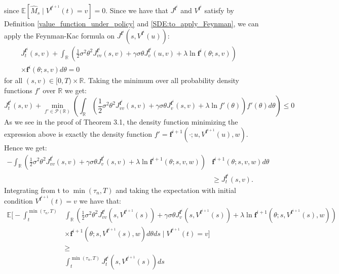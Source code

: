 \documentclass[oneside, a4paper, onecolumn, 11pt]{article}
\begin{document}
since $\mathbb{E}[\hat{M}_s\mid V^{\boldsymbol{f}^{i+1}}(t) = v]= 0$.
Since we have that $J^{\boldsymbol{f}^i}$ and $V^{\boldsymbol{f}^{i}}$ satisfy by Definition \eqref{value_function_under_policy}  and \eqref{SDE:to_apply_Feynman}, we can apply the Feynman-Kac formula on $J^{\boldsymbol{f}^i}(s,V^{\boldsymbol{f}^{i}}(u))$:
\begin{align*}
J_t^{\boldsymbol{f}^i}(s,v)+ \int_{\mathbb{R}}\left(\frac{1}{2} \sigma^2 \theta^2 J^{\boldsymbol{f}^i}_{vv}(s, v) + \gamma\sigma\theta J^{\boldsymbol{f}^i}_v(u, v) + \lambda \ln{\boldsymbol{f}^i(\theta;s,v)}\right) &\\ \times \boldsymbol{f}^{i}(\theta;s,v) d\theta = 0 
\end{align*}
for all $(s,v) \in [0,T) \times \mathbb{R}$. 
Taking the minimum over all probability density functions $f'$ over $\mathbb{R}$ we get: 
\begin{equation}
   J_t^{\boldsymbol{f}^i}(s,v) +  \min_{f' \in \mathcal{P}(\mathbb{R})}\left(\int_{\mathbb{R}}\left(\frac{1}{2} \sigma^2 \theta^2 J^{\boldsymbol{f}^i}_{vv}(s, v) + \gamma\sigma\theta J^{\boldsymbol{f}^i}_v(s, v) + \lambda \ln{f'(\theta)}\right) f'(\theta) d\theta\right) \leq 0  
\end{equation}
As we see in the proof of Theorem 3.1, the density function minimizing the expression above is exactly the density function $f'=\boldsymbol{f}^{i+1}(\cdot;u,V^{\boldsymbol{f}^{i+1}}(u),w)$. Hence we get: 
\begin{align*}
-\int_{\mathbb{R}}\left(\frac{1}{2} \sigma^2 \theta^2 J^{\boldsymbol{f}^i}_{vv}(s, v) + \gamma\sigma\theta J^{\boldsymbol{f}^i}_v(s, v) + \lambda \ln{\boldsymbol{f}^{i+1}(\theta;s,v,w)}\right)&\boldsymbol{f}^{i+1}(\theta;s,v,w)d\theta \\
&\geq J_t^{\boldsymbol{f}^i}(s,v).
\end{align*}
Integrating from t to $\min(\tau_n, T)$ and taking the expectation with initial condition $ V^{\boldsymbol{f}^{i+1}}(t)=v$ we have that:
\begin{align*}
 \mathbb{E}\Bigg[-\int_{t}^{\min(\tau_n,T)}&\int_{\mathbb{R}}\left(\frac{1}{2} \sigma^2 \theta^2 J^{\boldsymbol{f}^i}_{vv}(s, V^{\boldsymbol{f}^{i+1}}(s)) + \gamma\sigma\theta J^{\boldsymbol{f}^i}_v(s, V^{\boldsymbol{f}^{i+1}}(s)) + \lambda \ln{\boldsymbol{f}^{i+1}(\theta;s,V^{\boldsymbol{f}^{i+1}}(s),w)}\right)\\
 &\times \boldsymbol{f}^{i+1}(\theta;s,V^{\boldsymbol{f}^{i+1}}(s),w)d\theta  ds \mid V^{\boldsymbol{f}^{i+1}}(t)=v \Bigg]\\ &\geq\\
  & \int_{t}^{\min(\tau_n,T)} J_t^{\boldsymbol{f}^i}(s,V^{\boldsymbol{f}^{i+1}}(s))ds
\end{align*}
\end{document}
